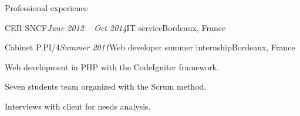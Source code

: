 \begin{rSection}{Professional experience}
\begin{rSubsection}{CER SNCF}{\em June 2012 -- Oct 2014}{IT service}{Bordeaux, France}
  \end{rSubsection}


  \begin{rSubsection}{Cabinet P.PI/4}{\em Summer 2011}{Web developer summer internship}{Bordeaux, France}
    \item Web development in PHP with the CodeIgniter framework.
    \item Seven students team organized with the Scrum method.
    \item Interviews with client for needs analysis.
  \end{rSubsection}

\end{rSection}
